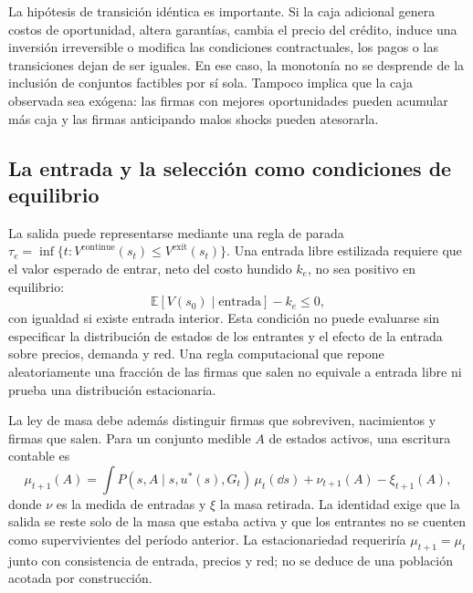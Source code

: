 \documentclass[11pt,a4paper]{article}
\begin{document}
La hipótesis de transición idéntica es importante. Si la caja adicional genera costos de oportunidad, altera garantías, cambia el precio del crédito, induce una inversión irreversible o modifica las condiciones contractuales, los pagos o las transiciones dejan de ser iguales. En ese caso, la monotonía no se desprende de la inclusión de conjuntos factibles por sí sola. Tampoco implica que la caja observada sea exógena: las firmas con mejores oportunidades pueden acumular más caja y las firmas anticipando malos shocks pueden atesorarla.

\subsection{La entrada y la selección como condiciones de equilibrio}
La salida puede representarse mediante una regla de parada $\tau_e=\inf\{t:V^{\mathrm{continue}}(s_t)\leq V^{\mathrm{exit}}(s_t)\}$. Una entrada libre estilizada requiere que el valor esperado de entrar, neto del costo hundido $k_e$, no sea positivo en equilibrio:
\begin{equation}
\mathbb E[V(s_0)\mid \text{entrada}]-k_e\leq0,
\end{equation}
con igualdad si existe entrada interior. Esta condición no puede evaluarse sin especificar la distribución de estados de los entrantes y el efecto de la entrada sobre precios, demanda y red. Una regla computacional que repone aleatoriamente una fracción de las firmas que salen no equivale a entrada libre ni prueba una distribución estacionaria.

La ley de masa debe además distinguir firmas que sobreviven, nacimientos y firmas que salen. Para un conjunto medible $A$ de estados activos, una escritura contable es
\begin{equation}
\mu_{t+1}(A)=\int P(s,A\mid s,u^*(s),G_t)\,\mu_t(\dd s)+\nu_{t+1}(A)-\xi_{t+1}(A),
\label{eq:mass_balance}
\end{equation}
donde $\nu$ es la medida de entradas y $\xi$ la masa retirada. La identidad exige que la salida se reste solo de la masa que estaba activa y que los entrantes no se cuenten como supervivientes del período anterior. La estacionariedad requeriría $\mu_{t+1}=\mu_t$ junto con consistencia de entrada, precios y red; no se deduce de una población acotada por construcción.
\end{document}
